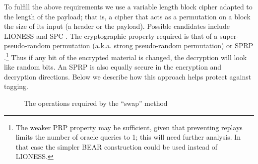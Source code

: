 \documentclass[11pt]{IEEEtran}
\begin{document}
To fulfill the above requirements we use a variable length block
cipher adapted to the length of the payload; that
is, a cipher that acts as a permutation on a block the size of its
input (a header or the payload).  Possible candidates
include LIONESS \cite{BEAR-LIONESS} and SPC \cite{SPC}.
The cryptographic property required is that of a super-pseudo-random
permutation (a.k.a. strong pseudo-random permutation) or SPRP \cite{sprp}.\footnote{
The weaker PRP property may be sufficient, given that preventing
replays limits the number of oracle queries to 1; this will need
further analysis.  In that case the simpler BEAR construction
\cite{BEAR-LIONESS} could be used instead of LIONESS.}
Thus if any bit of
the encrypted material is changed, the decryption will look like random
bits.  An SPRP is also equally secure in the encryption and decryption
directions.  Below we describe
how this approach helps protect against tagging.


%


\begin{figure}
\begin{center}
\caption{The operations required by the ``swap'' method} 
\end{center}
\end{figure}
\end{document}
